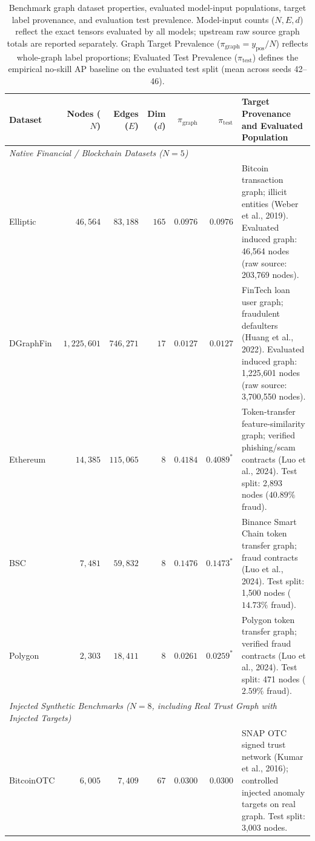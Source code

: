 \documentclass[11pt,a4paper]{article}
\begin{document}
\begin{table}[htbp]
\centering\fontsize{7.5pt}{8.8pt}\selectfont\setlength{\tabcolsep}{2.5pt}
\caption{Benchmark graph dataset properties, evaluated model-input populations, target label provenance, and evaluation test prevalence. Model-input counts ($N, E, d$) reflect the exact tensors evaluated by all models; upstream raw source graph totals are reported separately. Graph Target Prevalence ($\pi_{\mathrm{graph}} = y_{\mathrm{pos}} / N$) reflects whole-graph label proportions; Evaluated Test Prevalence ($\pi_{\mathrm{test}}$) defines the empirical no-skill AP baseline on the evaluated test split (mean across seeds 42--46).}
\label{tab:dataset_properties}
\begin{tabularx}{\textwidth}{lrrrrr>{\raggedright\arraybackslash}X}\toprule
\textbf{Dataset} & \textbf{Nodes ($N$)} & \textbf{Edges ($E$)} & \textbf{Dim ($d$)} & $\pi_{\mathrm{graph}}$ & $\pi_{\mathrm{test}}$ & \textbf{Target Provenance and Evaluated Population} \\\midrule
\multicolumn{7}{l}{\textit{Native Financial / Blockchain Datasets ($N=5$)}} \\
Elliptic & $46,564$ & $83,188$ & $165$ & $0.0976$ & $0.0976$ & Bitcoin transaction graph; illicit entities (Weber et al., 2019). Evaluated induced graph: 46,564 nodes (raw source: 203,769 nodes). \\
DGraphFin & $1,225,601$ & $746,271$ & $17$ & $0.0127$ & $0.0127$ & FinTech loan user graph; fraudulent defaulters (Huang et al., 2022). Evaluated induced graph: 1,225,601 nodes (raw source: 3,700,550 nodes). \\
Ethereum & $14,385$ & $115,065$ & $8$ & $0.4184$ & $0.4089^*$ & Token-transfer feature-similarity graph; verified phishing/scam contracts (Luo et al., 2024). Test split: 2,893 nodes ($40.89\%$ fraud). \\
BSC & $7,481$ & $59,832$ & $8$ & $0.1476$ & $0.1473^*$ & Binance Smart Chain token transfer graph; fraud contracts (Luo et al., 2024). Test split: 1,500 nodes ($14.73\%$ fraud). \\
Polygon & $2,303$ & $18,411$ & $8$ & $0.0261$ & $0.0259^*$ & Polygon token transfer graph; verified fraud contracts (Luo et al., 2024). Test split: 471 nodes ($2.59\%$ fraud). \\
\midrule
\multicolumn{7}{l}{\textit{Injected Synthetic Benchmarks ($N=8$, including Real Trust Graph with Injected Targets)}} \\
BitcoinOTC & $6,005$ & $7,409$ & $67$ & $0.0300$ & $0.0300$ & SNAP OTC signed trust network (Kumar et al., 2016); controlled injected anomaly targets on real graph. Test split: 3,003 nodes. \\

\end{tabularx}
\end{table}
\end{document}
